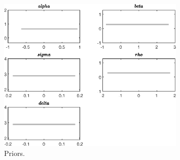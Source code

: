  
\begin{figure}[H]
\centering
\includegraphics[width=0.80\textwidth]{RBC_kz/graphs/RBC_kz_Priors1}
\caption{Priors.}\label{Fig:Priors:1}
\end{figure}
 
